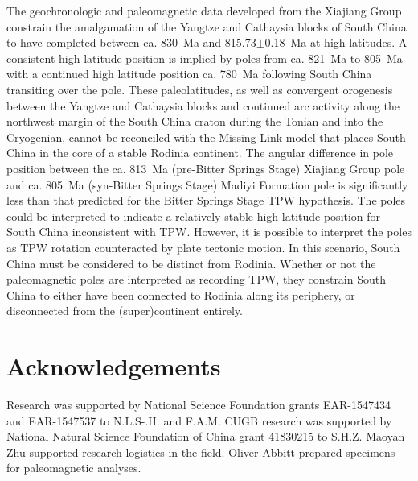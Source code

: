 The geochronologic and paleomagnetic data developed from the Xiajiang Group constrain the amalgamation of the Yangtze and Cathaysia blocks of South China to have completed between ca. 830~Ma and 815.73$\pm$0.18~Ma at high latitudes. A consistent high latitude position is implied by poles from ca. 821~Ma to 805~Ma with a continued high latitude position ca. 780~Ma following South China transiting over the pole. These paleolatitudes, as well as convergent orogenesis between the Yangtze and Cathaysia blocks and continued arc activity along the northwest margin of the South China craton during the Tonian and into the Cryogenian, cannot be reconciled with the Missing Link model that places South China in the core of a stable Rodinia continent. The angular difference in pole position between the ca. 813~Ma (pre-Bitter Springs Stage) Xiajiang Group pole and ca. 805~Ma (syn-Bitter Springs Stage) Madiyi Formation pole is significantly less than that predicted for the Bitter Springs Stage TPW hypothesis. The poles could be interpreted to indicate a relatively stable high latitude position for South China inconsistent with TPW. However, it is possible to interpret the poles as TPW rotation counteracted by plate tectonic motion. In this scenario, South China must be considered to be distinct from Rodinia. Whether or not the paleomagnetic poles are interpreted as recording TPW, they constrain South China to either have been connected to Rodinia along its periphery, or disconnected from the (super)continent entirely.

\section{Acknowledgements}

Research was supported by National Science Foundation grants EAR-1547434 and EAR-1547537 to N.L.S-.H. and F.A.M. CUGB research was supported by National Natural Science Foundation of China grant 41830215 to S.H.Z. Maoyan Zhu supported research logistics in the field. Oliver Abbitt prepared specimens for paleomagnetic analyses.
